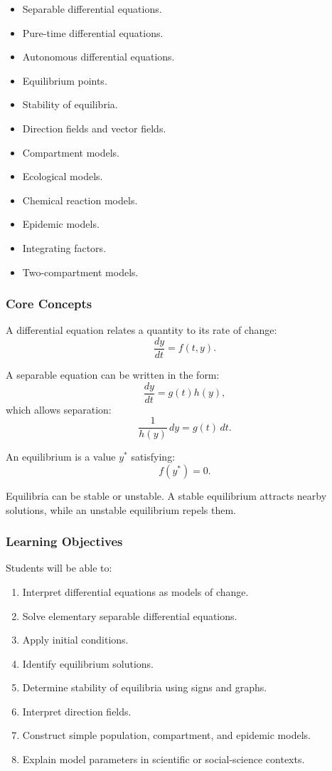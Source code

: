 \documentclass[11pt]{article}
\begin{document}
\begin{itemize}
    \item Separable differential equations.
    \item Pure-time differential equations.
    \item Autonomous differential equations.
    \item Equilibrium points.
    \item Stability of equilibria.
    \item Direction fields and vector fields.
    \item Compartment models.
    \item Ecological models.
    \item Chemical reaction models.
    \item Epidemic models.
    \item Integrating factors.
    \item Two-compartment models.
\end{itemize}

\subsubsection*{Core Concepts}

A differential equation relates a quantity to its rate of change:
\[
\frac{dy}{dt}=f(t,y).
\]

A separable equation can be written in the form:
\[
\frac{dy}{dt}=g(t)h(y),
\]
which allows separation:
\[
\frac{1}{h(y)}\,dy=g(t)\,dt.
\]

An equilibrium is a value \(y^*\) satisfying:
\[
f(y^*)=0.
\]

Equilibria can be stable or unstable. A stable equilibrium attracts nearby solutions, while an unstable equilibrium repels them.

\subsubsection*{Learning Objectives}

Students will be able to:

\begin{enumerate}[label=\arabic*.]
    \item Interpret differential equations as models of change.
    \item Solve elementary separable differential equations.
    \item Apply initial conditions.
    \item Identify equilibrium solutions.
    \item Determine stability of equilibria using signs and graphs.
    \item Interpret direction fields.
    \item Construct simple population, compartment, and epidemic models.
    \item Explain model parameters in scientific or social-science contexts.
\end{enumerate}
\end{document}
